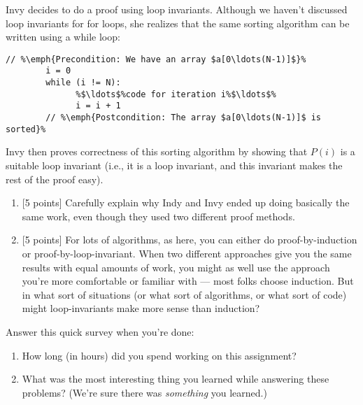 \documentclass[12pt,letterpaper,boxed,cm]{hmcpset}
\begin{document}
\begin{problem}[4.]
    Invy decides to do a proof using loop invariants. Although we haven't discussed loop invariants for for loops, she realizes that the same sorting algorithm can be written using a while loop:
    \begin{lstlisting}[escapechar=\%]
        // %\emph{Precondition: We have an array $a[0\ldots(N-1)]$}%
        i = 0
        while (i != N):
              %$\ldots$%code for iteration i%$\ldots$%
              i = i + 1
        // %\emph{Postcondition: The array $a[0\ldots(N-1)]$ is sorted}%
    \end{lstlisting}
    Invy then proves correctness of this sorting algorithm by showing that $P(i)$ is a suitable loop invariant (i.e., it is a loop invariant, and this invariant makes the rest of the proof easy).
    \begin{enumerate}[label=\Alph*.]
        \item {[5 points]} Carefully explain why Indy and Invy ended up doing basically the same work, even though they used two different proof methods.
        \item {[5 points]} For lots of algorithms, as here, you can either do proof-by-induction or proof-by-loop-invariant. When two different approaches give you the same results with equal amounts of work, you might as well use the approach you're more comfortable or  familiar with --- most folks choose induction. But in what sort of situations (or what sort of algorithms, or what sort of code) might loop-invariants make more sense than induction?
    \end{enumerate}
\end{problem}

\begin{solution}
    \vfill
\end{solution}
\newpage

\begin{problem} Answer this quick survey when you're done:
    \begin{enumerate}[label=\Alph*.]
        \item How long (in hours) did you spend working on this assignment?
        \item What was the most interesting thing you learned while answering these problems? (We’re sure there was \emph{something} you learned.)
    \end{enumerate}
\end{problem}

\begin{solution}
    \vfill
\end{solution}
\newpage
\end{document}
